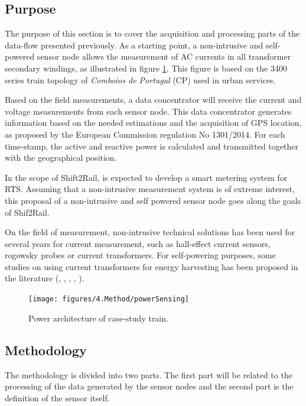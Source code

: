 \subsection{Purpose}

The purpose of this section is to cover the acquisition and processing parts of the data-flow presented previously. As a starting point, a non-intrusive and self-powered sensor node allows the measurement of AC currents in all transformer secondary windings, as illustrated in figure \ref{fig:4.powerSensing}. This figure is based on the 3400 series train topology of \textit{Comboios de Portugal} (CP) used in urban services.

Based on the field measurements, a data concentrator will receive the current and voltage measurements from each sensor node. This data concentrator generates information based on the needed estimations and the acquisition of GPS location, as proposed by the European Commission regulation No 1301/2014. For each time-stamp, the active and reactive power is calculated and transmitted together with the geographical position.

In the scope of Shift2Rail, is expected to develop a smart metering system for \ac{RTS}. Assuming that a non-intrusive measurement system is of extreme interest, this proposal of a non-intrusive and self powered sensor node goes along the goals of Shif2Rail.

On the field of measurement, non-intrusive technical solutions has been used for several years for current measurement, such as hall-effect current sensors, rogowsky probes or current transformers.
For self-powering purposes, some studies on using current transformers for energy harvesting has been proposed in the literature (\cite{ahola2008}, \cite{wu2013}, \cite{moon2015}, \cite{amaro2015}, \cite{brunelli2016}).


\begin{figure}[h!]
	\centering
	\vspace{-1em}
	\texttt{[image: figures/4.Method/powerSensing]}
	\caption{Power architecture of case-study train.}
	\label{fig:4.powerSensing}
\end{figure}






\subsection{Methodology}

The methodology is divided into two parts. The first part will be related to the processing of the data generated by the sensor nodes and the second part is the definition of the sensor itself.

